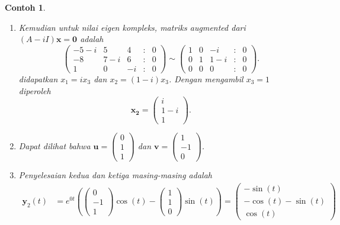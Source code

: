\documentclass[a4paper]{article}
\theoremstyle{definisi}
\newtheorem{contoh}{Contoh}[section]
\numberwithin{equation}{section}
\begin{document}
\begin{contoh}
\begin{enumerate}[label=Langkah \arabic*: ,leftmargin=*]
      Jadi
      \[\mathbf{y}_1=\begin{pmatrix}2\\2\\1\end{pmatrix}e^{2t}\]
      adalah penyelesaian real dari \eqref{eq:contoh_pd_trench_1}. 
      \item Kemudian untuk nilai eigen kompleks, matriks \textit{augmented} dari $(A-iI)\mathbf{x} = \mathbf{0}$ adalah
      \begin{equation*}
        \begin{pmatrix}
          -5-i & 5 & 4 &:& 0\\
          -8 & 7-i & 6 &:& 0\\
          1 & 0 & -i &:& 0
        \end{pmatrix} \sim \begin{pmatrix}
          1 & 0 & -i &:& 0\\
          0 & 1 & 1-i & :&0\\
          0 & 0 & 0 & :&0
        \end{pmatrix}.
      \end{equation*}
      didapatkan $x_1 = ix_3$ dan $x_2 = (1-i)x_3$. Dengan mengambil $x_3 = 1$ diperoleh
      \[\mathbf{x_2} = \begin{pmatrix}i\\1-i\\1\end{pmatrix}.\]
      \item Dapat dilihat bahwa $\mathbf{u}= \begin{pmatrix}0\\1\\1\end{pmatrix}$ dan $\mathbf{v} = \begin{pmatrix}1\\-1\\0\end{pmatrix}$.
      \item Penyelesaian kedua dan ketiga masing-masing adalah
      \begin{align*}
        \mathbf{y}_2(t) &= e^{0t}\left(\begin{pmatrix}0\\-1\\1\end{pmatrix}\cos(t) - \begin{pmatrix}1\\1\\0\end{pmatrix}\sin(t)\right)=\begin{pmatrix}-\sin(t)\\-\cos(t)-\sin(t)\\\cos(t)\end{pmatrix}

\end{align*}
\end{enumerate}
\end{contoh}
\end{document}
